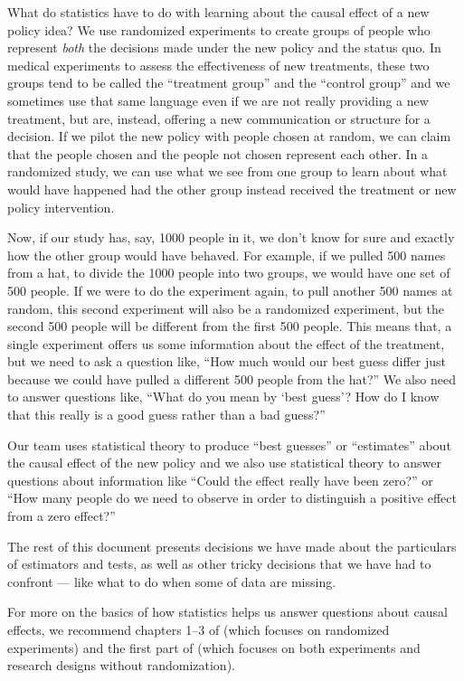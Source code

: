 \documentclass[
  12pt,
]{book}
\theoremstyle{definition}
\theoremstyle{definition}
\theoremstyle{definition}
\theoremstyle{remark}
\begin{document}
What do statistics have to do with learning about the causal effect of a
new policy idea? We use randomized experiments to create groups of
people who represent \emph{both} the decisions made under the new policy
and the status quo. In medical experiments to assess the effectiveness
of new treatments, these two groups tend to be called the ``treatment
group'' and the ``control group'' and we sometimes use that same
language even if we are not really providing a new treatment, but are,
instead, offering a new communication or structure for a decision. If we
pilot the new policy with people chosen at random, we can claim that the
people chosen and the people not chosen represent each other. In a
randomized study, we can use what we see from one group to learn about
what would have happened had the other group instead received the
treatment or new policy intervention.

Now, if our study has, say, 1000 people in it, we don't know for sure
and exactly how the other group would have behaved. For example, if we
pulled 500 names from a hat, to divide the 1000 people into two groups,
we would have one set of 500 people. If we were to do the experiment
again, to pull another 500 names at random, this second experiment will
also be a randomized experiment, but the second 500 people will be
different from the first 500 people. This means that, a single
experiment offers us some information about the effect of the treatment,
but we need to ask a question like, ``How much would our best guess
differ just because we could have pulled a different 500 people from the
hat?'' We also need to answer questions like, ``What do you mean by
`best guess'? How do I know that this really is a good guess rather than
a bad guess?''

Our team uses statistical theory to produce ``best guesses'' or
``estimates'' about the causal effect of the new policy and we also use
statistical theory to answer questions about information like ``Could
the effect really have been zero?'' or ``How many people do we need to
observe in order to distinguish a positive effect from a zero effect?''

The rest of this document presents decisions we have made about the
particulars of estimators and tests, as well as other tricky decisions
that we have had to confront --- like what to do when some of data are
missing.

For more on the basics of how statistics helps us answer questions about
causal effects, we recommend chapters 1--3 of \citet{gerber_field_2012}
(which focuses on randomized experiments) and the first part of
\citet{rosenbaum2017} (which focuses on both experiments and research
designs without randomization).
\end{document}

